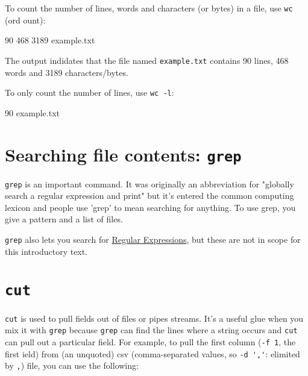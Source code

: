 To count the number of lines, words and characters (or bytes) in a file, use \lstinline|wc| (ord ount):

\begin{prompt}
      90     468    3189  example.txt
\end{prompt}

The output indidates that the file named \lstinline|example.txt| contains 90 lines, 468 words and 3189 characters/bytes.

To only count the number of lines, use \lstinline|wc -l|:

\begin{prompt}
      90    example.txt
\end{prompt}

\section{Searching file contents: \texttt{grep}}

\lstinline|grep| is an important command. It was originally an abbreviation for
"globally search a regular expression and print" but it's entered the common
computing lexicon and people use 'grep' to mean searching for anything. To use
grep, you give a pattern and a list of files.

\begin{prompt}
\end{prompt}

\lstinline|grep| also lets you search for
\href{https://en.wikipedia.org/wiki/Regular_expression}{Regular Expressions}, but
these are not in scope for this introductory text.

\section{\texttt{cut}}

\lstinline|cut| is used to pull fields out of files or pipes streams.
It's a useful glue when you mix it with \lstinline|grep| because \lstinline|grep| can find the
lines where a string occurs and \lstinline|cut| can pull out a particular field. For
example, to pull the first column (\lstinline|-f 1|, the first ield)
from (an unquoted) csv (comma-separated values, so \lstinline|-d ','|: elimited by \lstinline|,|)
file, you can use the following:

